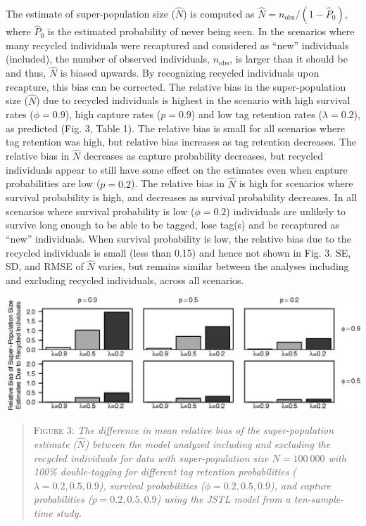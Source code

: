 \documentclass[12pt]{article}
\begin{document}
The estimate of super-population size (\(\hat{N}\)) is computed as
\(\hat{N}=n_{\text{obs}}/{(1-\hat{P}_0)}\), where \(\hat{P}_0\) is the
estimated probability of never being seen. In the scenarios where many
recycled individuals were recaptured and considered as ``new''
individuals (included), the number of observed individuals, \(n_{\text{obs}}\), is larger than it should  be and thus,
\(\hat{N}\) is biased upwards. By recognizing recycled individuals upon recapture, this bias can be corrected. The relative bias in the
super-population size (\(\hat{N}\)) due to recycled individuals is 
highest in the scenario with high survival rates (\(\phi=0.9\)), high
capture rates (\(p=0.9\)) and low tag retention rates (\(\lambda=0.2\)),
as predicted (Fig. 3, Table 1). The relative bias is small for all
scenarios where tag retention was high, but relative bias increases as
tag retention decreases. The relative bias in \(\hat{N}\) decreases as
capture probability decreases, but recycled individuals appear to still
have some effect on the estimates even when capture probabilities
are low (\(p=0.2\)). The relative bias in \(\hat{N}\) is high for
scenarios where survival probability is high, and decreases as
survival probability decreases. In all scenarios where survival probability is
low (\(\phi=0.2\)) individuals are unlikely to survive long enough to be
able to be tagged, lose tag(s) and be recaptured as  ``new''
individuals. When survival probability is low, the relative bias due to the recycled
individuals is small (less than 0.15) and hence not shown in Fig. 3.
SE, SD, and RMSE of \(\hat{N}\) varies, but remains similar between the
analyses including and excluding recycled individuals, across all
scenarios.

\includegraphics{RecycledPaper_files/figure-latex/Figure3_N-1.jpg}

\begin{quote}
\textsc{Figure 3:}
\textsl{The difference in mean relative bias of the super-population estimate ($\hat{N}$) between the model analyzed including and excluding the recycled individuals for data with super-population size $N=100\ 000$ with 100\% double-tagging for different tag retention probabilities ($\lambda=0.2,0.5,0.9$), survival probabilities ($\phi=0.2,0.5,0.9$), and capture probabilities ($p=0.2,0.5,0.9$) using the JSTL model from a ten-sample-time study.}
\end{quote}
\end{document}
